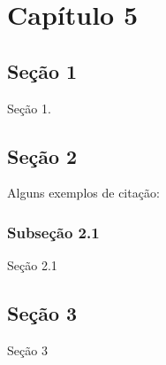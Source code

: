 \chapter{Capítulo 5}

	\section{Seção 1}
	
		Seção 1.
	
	\section{Seção 2}
	
		Alguns exemplos de citação:



		\subsection{Subseção 2.1}
	
			Seção 2.1
			
	\section{Seção 3}
	
		Seção 3